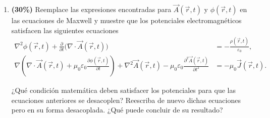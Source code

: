 \documentclass[a4paper]{article}
\begin{document}
\begin{enumerate}
\begin{enumerate}
        \item[(c)] \textbf{(30\%)} Reemplace las expresiones encontradas para $\vec{A}(\vec{r},t)$ y $\phi(\vec{r},t)$ en las ecuaciones de Maxwell y muestre que los potenciales electromagnéticos satisfacen las siguientes ecuaciones
        \begin{align}
        \nabla^2\phi(\vec{r},t) + \frac{\partial}{\partial t}\big(\nabla \cdot \vec{A}(\vec{r},t)\big)
        &= -\frac{\rho(\vec{r},t)}{\varepsilon_0}, \\
        \nabla\left(\nabla \cdot \vec{A}(\vec{r},t) + \mu_0\varepsilon_0\frac{\partial \phi(\vec{r},t)}{\partial t}\right)
        + \nabla^2\vec{A}(\vec{r},t)
        - \mu_0\varepsilon_0\frac{\partial^2 \vec{A}(\vec{r},t)}{\partial t^2}
        &= -\mu_0\vec{J}(\vec{r},t).
        \end{align}

        ¿Qué condición matemática deben satisfacer los potenciales para que las ecuaciones anteriores se desacoplen? Reescriba de nuevo dichas ecuaciones pero en su forma desacoplada. ¿Qué puede concluir de su resultado?
    \end{enumerate}
\end{enumerate}
\end{document}
